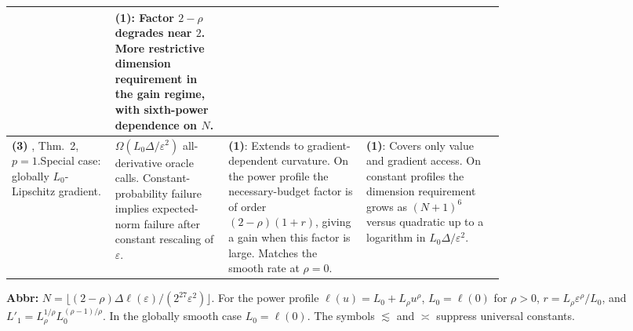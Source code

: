 \begin{table}[tp]
\begin{threeparttable}
\begin{tabularx}{\linewidth}{@{}>{\raggedright\arraybackslash}p{0.21\linewidth}>{\raggedright\arraybackslash}p{0.23\linewidth}>{\raggedright\arraybackslash}p{0.29\linewidth}>{\raggedright\arraybackslash}X@{}}
& \textbf{(1)}: Factor $2-\rho$ degrades near $2$. More restrictive dimension requirement in the gain regime, with sixth-power dependence on $N$. \\
\midrule
\textbf{(3)} \citep{sncCarmon2020v3}, Thm.~2, $p=1$.\newline Special case: globally $L_0$-Lipschitz gradient.
& $\Omega(L_0\Delta/\varepsilon^2)$ all-derivative oracle calls. Constant-probability failure implies expected-norm failure after constant rescaling of $\varepsilon$.
& \textbf{(1)}: Extends to gradient-dependent curvature. On the power profile the necessary-budget factor is of order $(2-\rho)(1+r)$, giving a gain when this factor is large. Matches the smooth rate at $\rho=0$.
& \textbf{(1)}: Covers only value and gradient access. On constant profiles the dimension requirement grows as $(N+1)^6$ versus quadratic up to a logarithm in $L_0\Delta/\varepsilon^2$. \\
\bottomrule
\end{tabularx}
\begin{tablenotes}[flushleft]\footnotesize
\item[] \textbf{Abbr:} $N=\lfloor(2-\rho)\Delta\ell(\varepsilon)/(2^{27}\varepsilon^2)\rfloor$. For the power profile $\ell(u)=L_0+L_\rho u^\rho$, $L_0=\ell(0)$ for $\rho>0$, $r=L_\rho\varepsilon^\rho/L_0$, and $L'_1=L_\rho^{1/\rho}L_0^{(\rho-1)/\rho}$. In the globally smooth case $L_0=\ell(0)$. The symbols $\lesssim$ and $\asymp$ suppress universal constants.
\end{tablenotes}
\end{threeparttable}
\end{table}
